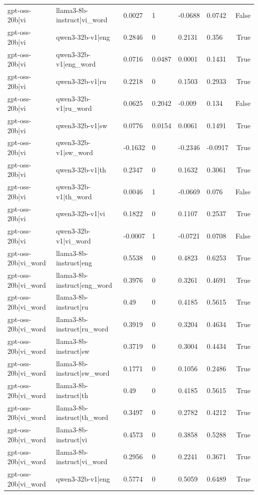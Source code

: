 \begin{table}
\begin{tabular}{llllllr}
gpt-oss-20b|vi & llama3-8b-instruct|vi_word & 0.0027 & 1 & -0.0688 & 0.0742 & False \\
gpt-oss-20b|vi & qwen3-32b-v1|eng & 0.2846 & 0 & 0.2131 & 0.356 & True \\
gpt-oss-20b|vi & qwen3-32b-v1|eng_word & 0.0716 & 0.0487 & 0.0001 & 0.1431 & True \\
gpt-oss-20b|vi & qwen3-32b-v1|ru & 0.2218 & 0 & 0.1503 & 0.2933 & True \\
gpt-oss-20b|vi & qwen3-32b-v1|ru_word & 0.0625 & 0.2042 & -0.009 & 0.134 & False \\
gpt-oss-20b|vi & qwen3-32b-v1|sw & 0.0776 & 0.0154 & 0.0061 & 0.1491 & True \\
gpt-oss-20b|vi & qwen3-32b-v1|sw_word & -0.1632 & 0 & -0.2346 & -0.0917 & True \\
gpt-oss-20b|vi & qwen3-32b-v1|th & 0.2347 & 0 & 0.1632 & 0.3061 & True \\
gpt-oss-20b|vi & qwen3-32b-v1|th_word & 0.0046 & 1 & -0.0669 & 0.076 & False \\
gpt-oss-20b|vi & qwen3-32b-v1|vi & 0.1822 & 0 & 0.1107 & 0.2537 & True \\
gpt-oss-20b|vi & qwen3-32b-v1|vi_word & -0.0007 & 1 & -0.0721 & 0.0708 & False \\
gpt-oss-20b|vi_word & llama3-8b-instruct|eng & 0.5538 & 0 & 0.4823 & 0.6253 & True \\
gpt-oss-20b|vi_word & llama3-8b-instruct|eng_word & 0.3976 & 0 & 0.3261 & 0.4691 & True \\
gpt-oss-20b|vi_word & llama3-8b-instruct|ru & 0.49 & 0 & 0.4185 & 0.5615 & True \\
gpt-oss-20b|vi_word & llama3-8b-instruct|ru_word & 0.3919 & 0 & 0.3204 & 0.4634 & True \\
gpt-oss-20b|vi_word & llama3-8b-instruct|sw & 0.3719 & 0 & 0.3004 & 0.4434 & True \\
gpt-oss-20b|vi_word & llama3-8b-instruct|sw_word & 0.1771 & 0 & 0.1056 & 0.2486 & True \\
gpt-oss-20b|vi_word & llama3-8b-instruct|th & 0.49 & 0 & 0.4185 & 0.5615 & True \\
gpt-oss-20b|vi_word & llama3-8b-instruct|th_word & 0.3497 & 0 & 0.2782 & 0.4212 & True \\
gpt-oss-20b|vi_word & llama3-8b-instruct|vi & 0.4573 & 0 & 0.3858 & 0.5288 & True \\
gpt-oss-20b|vi_word & llama3-8b-instruct|vi_word & 0.2956 & 0 & 0.2241 & 0.3671 & True \\
gpt-oss-20b|vi_word & qwen3-32b-v1|eng & 0.5774 & 0 & 0.5059 & 0.6489 & True \\

\end{tabular}
\end{table}
